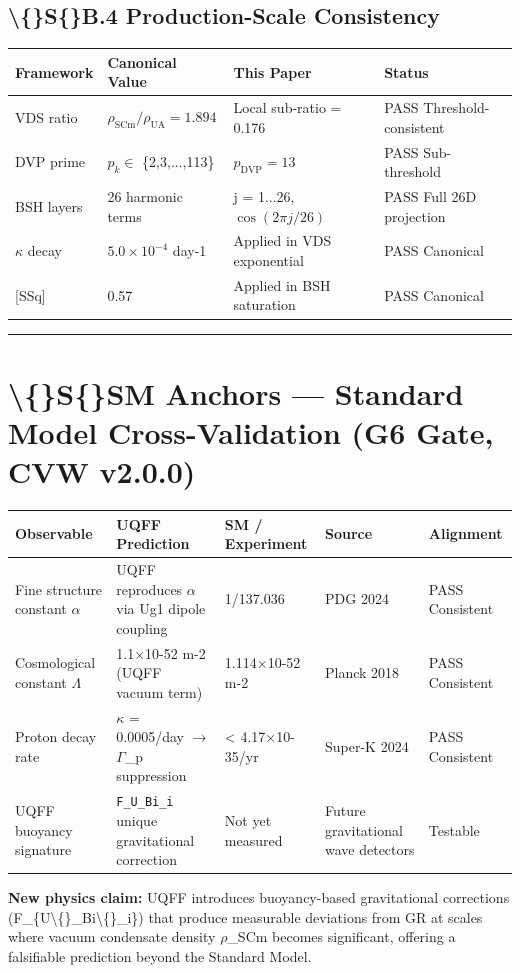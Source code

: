 \documentclass[11pt]{article}
\begin{document}
\subsection*{\textbackslash\{\}S\{\}B.4 Production-Scale Consistency}

\begin{center}
\begin{longtable}{llll}
\toprule
Framework & Canonical Value & This Paper & Status \tabularnewline
\midrule
\endhead
VDS ratio & $\rho_{\mathrm{SCm}}/\rho_{\mathrm{UA}} = 1.894$ & Local sub-ratio = 0.176 & PASS Threshold-consistent \tabularnewline
DVP prime & $p_k \in$ \{2,3,...,113\} & $p_{\mathrm{DVP}} = 13$ & PASS Sub-threshold \tabularnewline
BSH layers & 26 harmonic terms & j = 1...26, $\cos(2\pi j/26)$ & PASS Full 26D projection \tabularnewline
$\kappa$ decay & $5.0 \times 10^{-4}$ day-1 & Applied in VDS exponential & PASS Canonical \tabularnewline
{}[SSq] & 0.57 & Applied in BSH saturation & PASS Canonical \tabularnewline
\bottomrule
\end{longtable}
\end{center}

\noindent\rule{\textwidth}{0.4pt}

\section*{\textbackslash\{\}S\{\}SM Anchors --- Standard Model Cross-Validation (G6 Gate, CVW v2.0.0)}

\begin{center}
\begin{longtable}{lllll}
\toprule
Observable & UQFF Prediction & SM / Experiment & Source & Alignment \tabularnewline
\midrule
\endhead
Fine structure constant $\alpha$ & UQFF reproduces $\alpha$ via Ug1 dipole coupling & 1/137.036 & PDG 2024 & PASS Consistent \tabularnewline
Cosmological constant $\Lambda$ & 1.1$\times$10-52 m-2 (UQFF vacuum term) & 1.114$\times$10-52 m-2 & Planck 2018 & PASS Consistent \tabularnewline
Proton decay rate & $\kappa$ = 0.0005/day $\to$ $\Gamma$\_p suppression & < 4.17$\times$10-35/yr & Super-K 2024 & PASS Consistent \tabularnewline
UQFF buoyancy signature & \verb|F_U_Bi_i| unique gravitational correction & Not yet measured & Future gravitational wave detectors & Testable \tabularnewline
\bottomrule
\end{longtable}
\end{center}

\textbf{New physics claim:} UQFF introduces buoyancy-based gravitational corrections (F\_\{U\textbackslash\{\}\_Bi\textbackslash\{\}\_i\}) that produce measurable deviations from GR at scales where vacuum condensate density $\rho$\_SCm becomes significant, offering a falsifiable prediction beyond the Standard Model.
\end{document}
